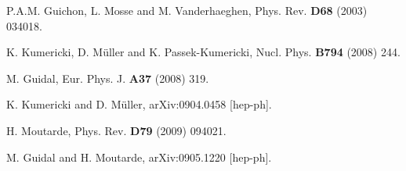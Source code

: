 \begin{thebibliography}{99}
P.A.M. Guichon, L. Mosse and M. Vanderhaeghen,
Phys. Rev. {\bf D68} (2003) 034018.



K. Kumericki, D. M\"uller and K. Passek-Kumericki,
Nucl. Phys. {\bf B794} (2008) 244.

M. Guidal, Eur. Phys. J. {\bf A37} (2008) 319.

K. Kumericki and D. M\"uller, %
arXiv:0904.0458 [hep-ph]. 

H. Moutarde, %
Phys. Rev. {\bf D79} (2009) 094021.


M. Guidal and H. Moutarde, arXiv:0905.1220 [hep-ph]. 



\end{thebibliography}